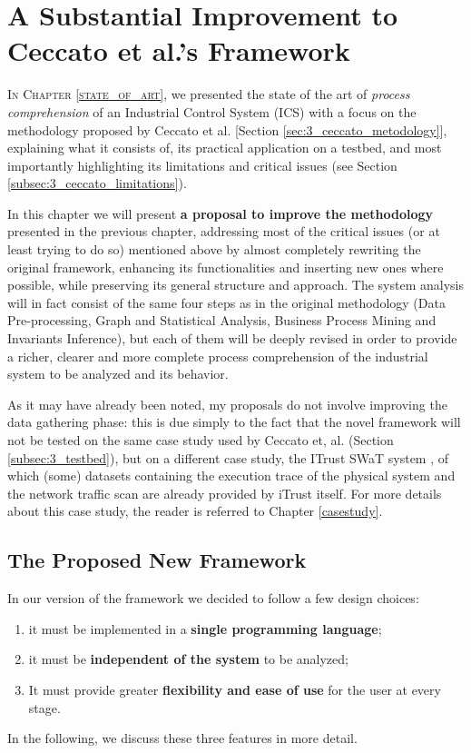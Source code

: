 \chapter{A Substantial Improvement to Ceccato et al.’s Framework}
\label{chap:proposal}

\linenumbers
\lettrine[lines=2]{I}{n Chapter \ref{state_of_art}}, we presented the state of the art of \textit{process comprehension} of an Industrial Control System (ICS) with a focus on the methodology proposed by Ceccato et al. \cite{ceccato}[Section \ref{sec:3_ceccato_metodology}], explaining what it consists of, its practical application on a testbed, and most importantly highlighting its limitations and critical issues (see Section \ref{subsec:3_ceccato_limitations}).

\bigskip
In this chapter we will present \textbf{a proposal to improve the methodology} presented in the previous chapter, addressing most of the critical issues (or at least trying to do so) mentioned above by almost completely rewriting the original framework, enhancing its functionalities and inserting new ones where possible, while preserving its general structure and approach. The system analysis will in fact consist of the same four steps as in the original methodology (Data Pre-processing, Graph and Statistical Analysis, Business Process Mining and Invariants Inference), but each of them will be deeply revised in order to provide a richer, clearer and more complete process comprehension of the industrial system to be analyzed and its behavior.

\bigskip
As it may have already been noted, my proposals do not involve improving the data gathering phase: this is due simply to the fact that the novel framework will not be tested on the same case study used by Ceccato et, al. (Section \ref{subsec:3_testbed}), but on a different case study, the ITrust SWaT system \cite{swat_home}, of which (some) datasets containing the execution trace of the physical system and the network traffic scan are already provided by iTrust itself. For more details about this case study, the reader is referred to Chapter \ref{casestudy}.

\section{The Proposed New Framework}
\label{sec:4_framework_presentation}
In our version of the framework we decided to follow a few design choices:

\begin{enumerate}
	\item it must be implemented in a \textbf{single programming language};
	\item it must be \textbf{independent of the system} to be analyzed;
	\item It must provide greater \textbf{flexibility and ease of use} for the user at every stage.
\end{enumerate}
In the following, we discuss these three features in more detail.

